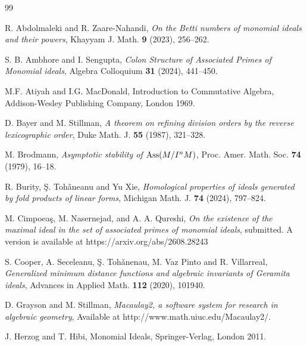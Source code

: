 \documentclass[11pt]{amsart}   %
\begin{document}
\renewcommand{\baselinestretch}{1.0}
\small\normalsize %
\bigskip

\begin{thebibliography}{99}

 R. Abdolmaleki and R. Zaare-Nahandi,
        {\em On the Betti numbers of monomial ideals and their powers},
        Khayyam J. Math. {\bf 9} (2023), 256--262.

 S. B. Ambhore and I. Sengupta,
        {\em Colon Structure of Associated Primes of Monomial ideals},
        Algebra Colloquium {\bf 31} (2024), 441--450.

     M.F. Atiyah and I.G. MacDonald,
        Introduction to Commutative Algebra,
        Addison-Wesley Publishing Company, London 1969.

 D. Bayer and M. Stillman,
        {\em A theorem on refining division orders by the reverse lexicographic order},
        Duke Math. J. {\bf 55} (1987), 321--328.

 M. Brodmann, 
        {\em Asymptotic stability of ${\rm Ass}(M/I^nM)$}, 
        Proc. Amer. Math. Soc. {\bf 74} (1979), 16--18.



 R. Burity, \c{S}. Toh\v{a}neanu and Yu Xie,
        {\em Homological properties of ideals generated by fold products of linear forms},
        Michigan Math. J. {\bf 74} (2024), 797--824.

  M. Cimpoea\c{s}, M. Nasernejad, and A. A. Qureshi, 
    \textit{On the existence of  the maximal ideal in  the set of associated primes of monomial ideals}, submitted. A version is available at https://arxiv.org/abs/2608.28243

 S. Cooper, A. Seceleanu, \c{S}. Toh\v{a}nenau, M. Vaz Pinto and R. Villarreal,
{\em Generalized minimum distance functions and algebraic invariants of Geramita ideals}, Advances in Applied Math. {\bf 112} (2020), 101940.


 D. Grayson and M. Stillman, {\em Macaulay2, a software system for research in algebraic geometry},
          Available at http://www.math.uiuc.edu/Macaulay2/.

 J. Herzog and T. Hibi,
        Monomial Ideals,
        Springer-Verlag, London 2011.


\end{thebibliography}
\end{document}
